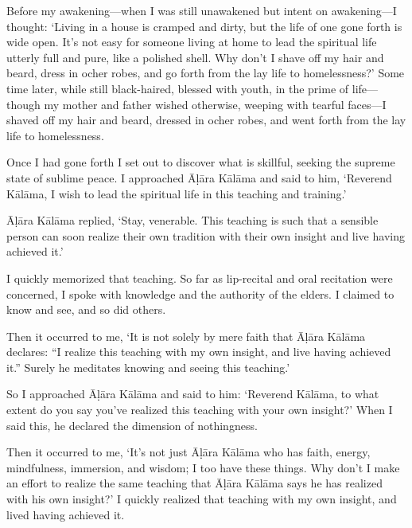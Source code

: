 \documentclass[12pt,openany]{book}%
\begin{document}
Before my awakening—when I was still unawakened but intent on awakening—I thought: ‘Living in a house is cramped and dirty, but the life of one gone forth is wide open. It’s not easy for someone living at home to lead the spiritual life utterly full and pure, like a polished shell. Why don’t I shave off my hair and beard, dress in ocher robes, and go forth from the lay life to homelessness?’ Some time later, while still black-haired, blessed with youth, in the prime of life—though my mother and father wished otherwise, weeping with tearful faces—I shaved off my hair and beard, dressed in ocher robes, and went forth from the lay life to homelessness. 

Once I had gone forth I set out to discover what is skillful, seeking the supreme state of sublime peace. I approached \textsanskrit{Āḷāra} \textsanskrit{Kālāma} and said to him, ‘Reverend \textsanskrit{Kālāma}, I wish to lead the spiritual life in this teaching and training.’ 

\textsanskrit{Āḷāra} \textsanskrit{Kālāma} replied, ‘Stay, venerable. This teaching is such that a sensible person can soon realize their own tradition with their own insight and live having achieved it.’ 

I quickly memorized that teaching. So far as lip-recital and oral recitation were concerned, I spoke with knowledge and the authority of the elders. I claimed to know and see, and so did others. 

Then it occurred to me, ‘It is not solely by mere faith that \textsanskrit{Āḷāra} \textsanskrit{Kālāma} declares: “I realize this teaching with my own insight, and live having achieved it.” Surely he meditates knowing and seeing this teaching.’ 

So I approached \textsanskrit{Āḷāra} \textsanskrit{Kālāma} and said to him: ‘Reverend \textsanskrit{Kālāma}, to what extent do you say you’ve realized this teaching with your own insight?’ When I said this, he declared the dimension of nothingness. 

Then it occurred to me, ‘It’s not just \textsanskrit{Āḷāra} \textsanskrit{Kālāma} who has faith, energy, mindfulness, immersion, and wisdom; I too have these things. Why don’t I make an effort to realize the same teaching that \textsanskrit{Āḷāra} \textsanskrit{Kālāma} says he has realized with his own insight?’ I quickly realized that teaching with my own insight, and lived having achieved it. 
\end{document}
